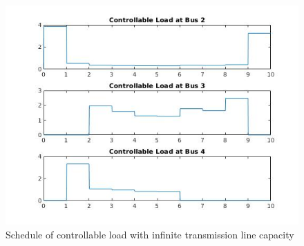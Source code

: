 \documentclass[11pt]{article}
\begin{document}
\begin{figure}[H]
    \centering
    \includegraphics[scale=0.6]{figs/q2_a.jpg}
    \caption{Schedule of controllable load with infinite transmission line capacity}
    \label{fig::q2a}
\end{figure}
\end{document}
